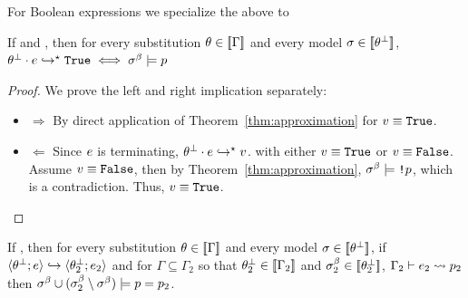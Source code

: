 For Boolean expressions we specialize the above to
\begin{corollary}\label{corollary:embedding}
If  and
,
then for every substitution $\theta\in[\![\Gamma]\!]$
and every model $\sigma\in[\![\theta^\perp]\!]$,
${{\theta^\perp} \cdot {\ensuremath{e}} }\hookrightarrow^{\star}{\texttt{True}} \iff \sigma^\beta \models p $
\end{corollary}
\begin{proof}
We prove the left and right implication separately:
\begin{itemize}
\item $\Rightarrow$
By direct application of Theorem~\ref{thm:approximation} for $v \equiv \texttt{True}$. 

\item $\Leftarrow$ 
Since $e$ is terminating, 
${{\theta^\perp} \cdot {\ensuremath{e}} }\hookrightarrow^{\star}{v}$. 
with either $v \equiv \texttt{True}$ or $v \equiv \texttt{False}$. 
Assume $v \equiv \texttt{False}$, then by Theorem~\ref{thm:approximation}, 
$\sigma^\beta \models \texttt{!} p$, which is a contradiction. 
Thus, $v \equiv \texttt{True}$.
\end{itemize}
\end{proof}


\begin{lemma}\label{lemma:approximation}
If ,
then for every substitution $\theta\in[\![\Gamma]\!]$
and every model $\sigma\in[\![\theta^\perp]\!]$,
if  
$\langle {\theta_{}^\perp}; e\rangle\hookrightarrow\langle {\theta_{2}^\perp}; e_2\rangle$
and
for $\Gamma \subseteq \Gamma_2$ so that ${\theta_{2}^\perp} \in [\![\Gamma_2]\!]$
and $\sigma^\beta_2\in[\![{\theta_{2}^\perp}]\!]$,
$ \Gamma_2\vdash e_2 \rightsquigarrow p_2 $
then 
$\sigma^\beta \cup (\sigma^\beta_2 \setminus \sigma^\beta) \models p = p_2$.
\end{lemma}

